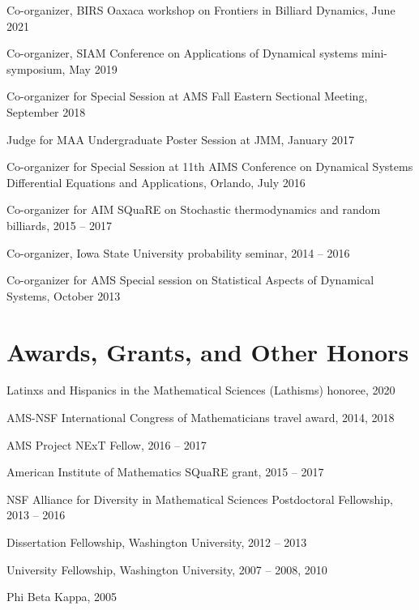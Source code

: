 \documentclass[10pt,letterpaper]{article}
\renewenvironment{itemize}{
  \begin{list}{}{
    \setlength{\leftmargin}{1.5em}
    \setlength{\itemsep}{0.25em}
    \setlength{\parskip}{0pt}
    \setlength{\parsep}{0.25em}
  }
}{
  \end{list}
}
\providecommand{\tightlist}{%
  \setlength{\itemsep}{0pt}\setlength{\parskip}{0pt}}
\let\tightlist\relax
\begin{document}
\begin{itemize}
\tightlist
\item
  Co-organizer, BIRS Oaxaca workshop on Frontiers in Billiard Dynamics,
  June 2021
\item
  Co-organizer, SIAM Conference on Applications of Dynamical systems
  mini-symposium, May 2019
\item
  Co-organizer for Special Session at AMS Fall Eastern Sectional
  Meeting, September 2018
\item
  Judge for MAA Undergraduate Poster Session at JMM, January 2017
\item
  Co-organizer for Special Session at 11th AIMS Conference on Dynamical
  Systems Differential Equations and Applications, Orlando, July 2016
\item
  Co-organizer for AIM SQuaRE on Stochastic thermodynamics and random
  billiards, 2015 -- 2017
\item
  Co-organizer, Iowa State University probability seminar, 2014 -- 2016
\item
  Co-organizer for AMS Special session on Statistical Aspects of
  Dynamical Systems, October 2013
\end{itemize}

\hypertarget{awards-grants-and-other-honors}{%
\section*{Awards, Grants, and Other
Honors}\label{awards-grants-and-other-honors}}

\begin{itemize}
\tightlist
\item
  Latinxs and Hispanics in the Mathematical Sciences (Lathisms) honoree,
  2020
\item
  AMS-NSF International Congress of Mathematicians travel award, 2014,
  2018
\item
  AMS Project NExT Fellow, 2016 -- 2017
\item
  American Institute of Mathematics SQuaRE grant, 2015 -- 2017
\item
  NSF Alliance for Diversity in Mathematical Sciences Postdoctoral
  Fellowship, 2013 -- 2016
\item
  Dissertation Fellowship, Washington University, 2012 -- 2013
\item
  University Fellowship, Washington University, 2007 -- 2008, 2010
\item
  Phi Beta Kappa, 2005
\end{itemize}
\end{document}
